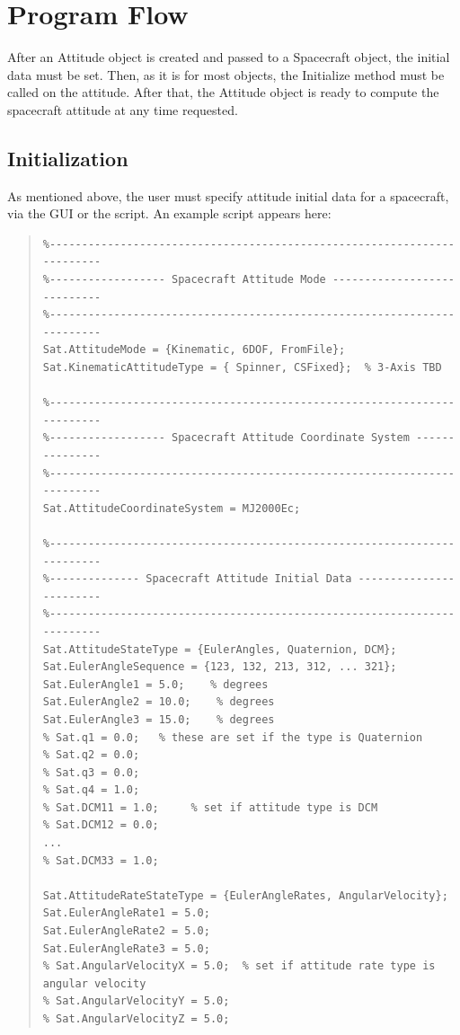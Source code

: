 \section{Program Flow}

After an Attitude object is created and passed to a Spacecraft object, the initial data must be set.  Then, as it is for most objects, the Initialize method must be called on the attitude.  After that, the Attitude object is ready to compute the spacecraft attitude at any time requested.

\subsection{Initialization}

As mentioned above, the user must specify attitude initial data for a spacecraft, via the GUI or the script.  An example script appears here:

\begin{quote}
\begin{verbatim}
%------------------------------------------------------------------------
%------------------ Spacecraft Attitude Mode ----------------------------
%------------------------------------------------------------------------
Sat.AttitudeMode = {Kinematic, 6DOF, FromFile};
Sat.KinematicAttitudeType = { Spinner, CSFixed};  % 3-Axis TBD

%------------------------------------------------------------------------
%------------------ Spacecraft Attitude Coordinate System ---------------
%------------------------------------------------------------------------
Sat.AttitudeCoordinateSystem = MJ2000Ec;

%------------------------------------------------------------------------
%-------------- Spacecraft Attitude Initial Data ------------------------
%------------------------------------------------------------------------
Sat.AttitudeStateType = {EulerAngles, Quaternion, DCM};
Sat.EulerAngleSequence = {123, 132, 213, 312, ... 321};
Sat.EulerAngle1 = 5.0;    % degrees
Sat.EulerAngle2 = 10.0;    % degrees
Sat.EulerAngle3 = 15.0;    % degrees
% Sat.q1 = 0.0;   % these are set if the type is Quaternion
% Sat.q2 = 0.0;
% Sat.q3 = 0.0;
% Sat.q4 = 1.0;
% Sat.DCM11 = 1.0;     % set if attitude type is DCM
% Sat.DCM12 = 0.0;
...
% Sat.DCM33 = 1.0;

Sat.AttitudeRateStateType = {EulerAngleRates, AngularVelocity};
Sat.EulerAngleRate1 = 5.0;
Sat.EulerAngleRate2 = 5.0;
Sat.EulerAngleRate3 = 5.0;
% Sat.AngularVelocityX = 5.0;  % set if attitude rate type is angular velocity
% Sat.AngularVelocityY = 5.0;
% Sat.AngularVelocityZ = 5.0;
\end{verbatim}
\end{quote}

